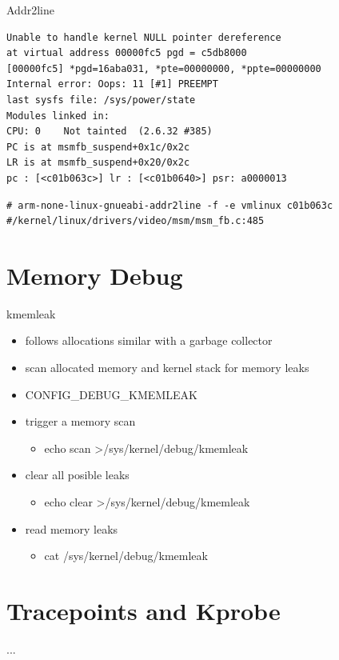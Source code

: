 \documentclass{workshop}
\begin{document}
\begin{frame}[fragile]{Addr2line}
\begin{verbatim}
Unable to handle kernel NULL pointer dereference
at virtual address 00000fc5 pgd = c5db8000
[00000fc5] *pgd=16aba031, *pte=00000000, *ppte=00000000
Internal error: Oops: 11 [#1] PREEMPT
last sysfs file: /sys/power/state
Modules linked in:
CPU: 0    Not tainted  (2.6.32 #385)
PC is at msmfb_suspend+0x1c/0x2c
LR is at msmfb_suspend+0x20/0x2c
pc : [<c01b063c>] lr : [<c01b0640>] psr: a0000013
\end{verbatim}

\begin{verbatim}
# arm-none-linux-gnueabi-addr2line -f -e vmlinux c01b063c
#/kernel/linux/drivers/video/msm/msm_fb.c:485
\end{verbatim}
\end{frame}

\section{Memory Debug}
\begin{frame}{kmemleak}
\begin{itemize}
\item follows allocations similar with a garbage collector
\item scan allocated memory and kernel stack for memory leaks
\item CONFIG_DEBUG_KMEMLEAK
\item trigger a memory scan
\begin{itemize}
\item echo scan \textgreater /sys/kernel/debug/kmemleak
\end{itemize}
\item clear all posible leaks
\begin{itemize}
\item echo clear \textgreater /sys/kernel/debug/kmemleak
\end{itemize}
\item read memory leaks
\begin{itemize}
\item cat /sys/kernel/debug/kmemleak
\end{itemize}
\end{itemize}

\end{frame}

\section{Tracepoints and Kprobe}
\begin{frame}{...}
\end{frame}
\end{document}
